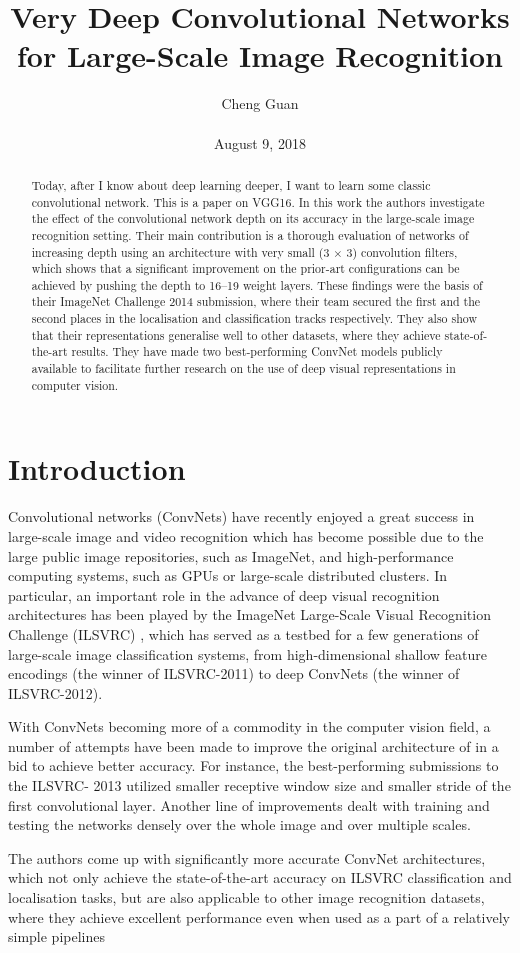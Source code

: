 \documentclass[10pt,twocolumn,letterpaper]{article}
\title{Very Deep Convolutional Networks for Large-Scale Image Recognition}
\author{Cheng Guan\\\\
August 9, 2018}
\begin{document}
\maketitle
\begin{abstract}
	Today, after I know about deep learning deeper, I want to learn some classic convolutional network. 
	This is a paper on VGG16. In this work the authors investigate the effect of the convolutional network depth on its
	accuracy in the large-scale image recognition setting. Their main contribution is
	a thorough evaluation of networks of increasing depth using an architecture with
	very small (3 $\times$ 3) convolution filters, which shows that a significant improvement
	on the prior-art configurations can be achieved by pushing the depth to 16–19
	weight layers. These findings were the basis of their ImageNet Challenge 2014
	submission, where their team secured the first and the second places in the localisation
	 and classification tracks respectively. They also show that their representations
	generalise well to other datasets, where they achieve state-of-the-art results. They
	have made two best-performing ConvNet models publicly available to facilitate 
	further research on the use of deep visual representations in computer vision.
\end{abstract}
\section{Introduction}
Convolutional networks (ConvNets) have recently enjoyed a great success in large-scale image and video recognition \cite{krizhevsky2012imagenet,zeiler2014visualizing,sermanet2013overfeat,simonyan2014two} which has become possible due to the large public image repositories, such as ImageNet, and high-performance computing systems, such as GPUs
or large-scale distributed clusters. In particular, an important role in the advance
of deep visual recognition architectures has been played by the ImageNet Large-Scale Visual Recognition Challenge (ILSVRC) \cite{russakovsky2015imagenet}, which has served as a testbed for a few
generations of large-scale image classification systems, from high-dimensional shallow feature encodings (the winner of ILSVRC-2011) to deep ConvNets (the winner of ILSVRC-2012).
\par
With ConvNets becoming more of a commodity in the computer vision field, a number of attempts have been made to improve the original architecture of \cite{krizhevsky2012imagenet} in a
bid to achieve better accuracy. For instance, the best-performing submissions to the ILSVRC-
2013 utilized smaller receptive window size and
smaller stride of the first convolutional layer. Another line of improvements dealt with training
and testing the networks densely over the whole image and over multiple scales.
\par
The authors come up with significantly more accurate ConvNet architectures, which not only
achieve the state-of-the-art accuracy on ILSVRC classification and localisation tasks, but are also
applicable to other image recognition datasets, where they achieve excellent performance even when
used as a part of a relatively simple pipelines
\end{document}
